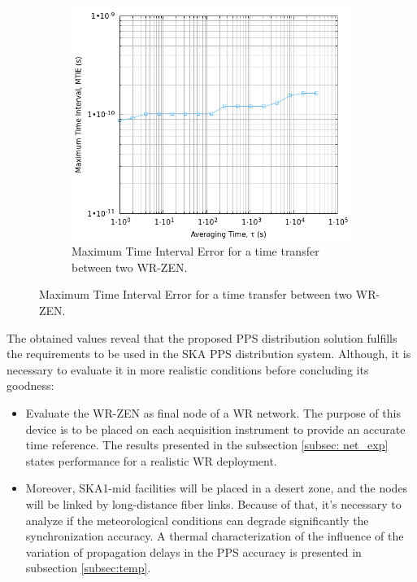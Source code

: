 \begin{figure}
	\begin{subfigure}[t]{0.48\textwidth}
		\includegraphics[width=\textwidth]{img/MTIE_exp1}
		\caption[MTIE plot for the WR-ZEN]{Maximum Time Interval Error for a 
		time transfer between two WR-ZEN.}
		\label{fig:mtie_exp1}
	\end{subfigure}
\end{figure}

The obtained values reveal that the proposed PPS distribution solution fulfills 
the requirements to be used in the SKA PPS distribution system. Although, it is 
necessary to evaluate it in more realistic conditions before concluding its goodness:

\begin{itemize}
	\item Evaluate the WR-ZEN as final node of a WR network. The purpose of 
	this device is to be placed on each acquisition instrument to provide an 
	accurate time reference. The results presented in the subsection 
	\ref{subsec: net_exp} states performance for a realistic WR deployment.
	
	\item Moreover, SKA1-mid facilities will be placed in a desert zone, and 
	the nodes will be linked by long-distance fiber links. Because of that, 
	it's 
	necessary to analyze if the meteorological conditions can degrade 
	significantly the synchronization accuracy. A thermal characterization of 
	the influence of the variation of propagation delays in the PPS accuracy is 
	presented in subsection \ref{subsec:temp}.
\end{itemize}   

